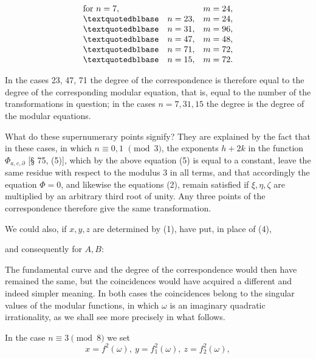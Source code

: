 \[
\begin{array}{ll}
\text{for } n=7, & m=24,\\
\textquotedblbase\quad n=23, & m=24,\\
\textquotedblbase\quad n=31, & m=96,\\
\textquotedblbase\quad n=47, & m=48,\\
\textquotedblbase\quad n=71, & m=72,\\
\textquotedblbase\quad n=15, & m=72.
\end{array}
\]

In the cases 23, 47, 71 the degree of the correspondence is therefore
equal to the degree of the corresponding modular equation, that is,
equal to the number of the transformations in question; in the cases
$n=7, 31, 15$ the degree is  the degree of the
modular equations.

What do these supernumerary points signify? They are explained by
the fact that in these cases, in which $n\equiv 0, 1$
$\pmod 3$, the exponents $h+2k$ in the function $\Phi_{a,c,\partial}$ [§ 75, (5)], which by the
above equation (5) is equal to a constant, leave the same residue
with respect to the modulus 3 in all terms, and
that accordingly the equation $\Phi=0$, and likewise the equations (2),
remain satisfied if $\xi, \eta, \zeta$ are multiplied by an arbitrary third root of unity. Any three points of the
correspondence therefore give the same transformation.

We could also, if $x, y, z$ are determined by (1), have put,
in place of (4),


and consequently for $A, B$:


The fundamental curve and the degree of the correspondence
would then have remained the same, but the coincidences would have
acquired a different and indeed simpler meaning. In
both cases the coincidences belong to the singular values
of the modular functions, in which $\omega$ is an imaginary quadratic
irrationality, as we shall see more precisely in
what follows.

In the case $n\equiv 3 \pmod 8$ we set
\[
x=f^2(\omega),\ y=f_1^2(\omega),\ z=f_2^2(\omega),
\]
